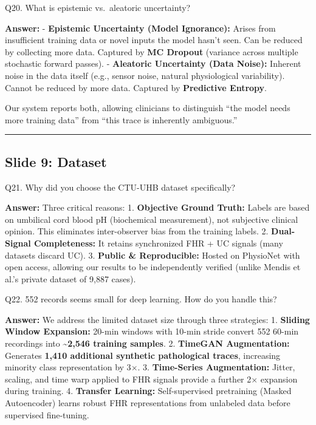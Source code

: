 \documentclass[11pt,a4paper]{article}
\begin{document}
\begin{questionbox}
Q20. What is epistemic vs.~aleatoric uncertainty?
\end{questionbox}
\textbf{Answer:} - \textbf{Epistemic Uncertainty (Model Ignorance):} Arises
from insufficient training data or novel inputs the model hasn't seen.
Can be reduced by collecting more data. Captured by \textbf{MC Dropout}
(variance across multiple stochastic forward passes). -
\textbf{Aleatoric Uncertainty (Data Noise):} Inherent noise in the data
itself (e.g., sensor noise, natural physiological variability). Cannot
be reduced by more data. Captured by \textbf{Predictive Entropy}.

Our system reports both, allowing clinicians to distinguish ``the model
needs more training data'' from ``this trace is inherently ambiguous.''

\begin{center}\rule{0.5\linewidth}{0.5pt}\end{center}

\subsection{Slide 9: Dataset}\label{slide-9-dataset}

\begin{questionbox}
Q21. Why did you choose the CTU-UHB dataset specifically?
\end{questionbox}
\textbf{Answer:} Three critical reasons: 1. \textbf{Objective Ground Truth:}
Labels are based on umbilical cord blood pH (biochemical measurement),
not subjective clinical opinion. This eliminates inter-observer bias
from the training labels. 2. \textbf{Dual-Signal Completeness:} It
retains synchronized FHR + UC signals (many datasets discard UC). 3.
\textbf{Public \& Reproducible:} Hosted on PhysioNet with open access,
allowing our results to be independently verified (unlike Mendis et
al.'s private dataset of 9,887 cases).

\begin{questionbox}
Q22. 552 records seems small for deep learning. How do you
handle this?
\end{questionbox}
\textbf{Answer:} We address the limited dataset size through three
strategies: 1. \textbf{Sliding Window Expansion:} 20-min windows with
10-min stride convert 552 60-min recordings into
\textbf{\textasciitilde2,546 training samples}. 2. \textbf{TimeGAN
Augmentation:} Generates \textbf{1,410 additional synthetic pathological
traces}, increasing minority class representation by 3$\times$. 3.
\textbf{Time-Series Augmentation:} Jitter, scaling, and time warp
applied to FHR signals provide a further 2$\times$ expansion during training.
4. \textbf{Transfer Learning:} Self-supervised pretraining (Masked
Autoencoder) learns robust FHR representations from unlabeled data
before supervised fine-tuning.
\end{document}
